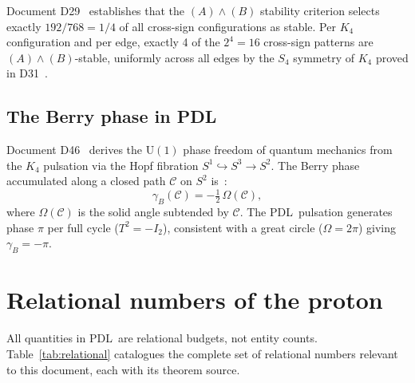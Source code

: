 \documentclass[12pt,a4paper]{article}
\theoremstyle{plain}
\theoremstyle{definition}
\theoremstyle{remark}
\newcommand{\PDL}{\textsc{PDL}}
\newcommand{\Kfour}{K_4}
\begin{document}
Document D29~\cite{PDL_D29} establishes that the $(A)\wedge(B)$ stability criterion selects exactly $192/768 = 1/4$ of all cross-sign configurations as stable. Per $\Kfour$ configuration and per edge, exactly 4 of the $2^4 = 16$ cross-sign patterns are $(A)\wedge(B)$-stable, uniformly across all edges by the $S_4$ symmetry of $\Kfour$ proved in D31~\cite{PDL_D31}.

\subsection{The Berry phase in PDL}

Document D46~\cite{PDL_D46} derives the $\mathrm{U}(1)$ phase freedom of quantum mechanics from the $\Kfour$ pulsation via the Hopf fibration $S^1 \hookrightarrow S^3 \to S^2$. The Berry phase accumulated along a closed path $\mathcal{C}$ on $S^2$ is~\cite{Berry1984}:
\begin{equation}
\gamma_B(\mathcal{C}) = -\tfrac{1}{2}\,\Omega(\mathcal{C}),
\label{eq:Berry}
\end{equation}
where $\Omega(\mathcal{C})$ is the solid angle subtended by $\mathcal{C}$. The \PDL\ pulsation generates phase $\pi$ per full cycle ($T^2 = -I_2$), consistent with a great circle ($\Omega = 2\pi$) giving $\gamma_B = -\pi$.

\section{Relational numbers of the proton}
\label{sec:relational}

All quantities in \PDL\ are relational budgets, not entity counts. Table~\ref{tab:relational} catalogues the complete set of relational numbers relevant to this document, each with its theorem source.
\end{document}

